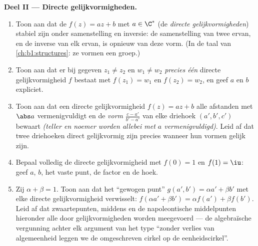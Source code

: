\begin{problem}
\medskip
\noindent\textbf{Deel II --- Directe gelijkvormigheden.}
\begin{enumerate}[resume]
  \item Toon aan dat de  $f(z) = az + b$ met $a \in \C^*$
        (de \emph{directe gelijkvormigheden}) stabiel zijn onder
        samenstelling en inversie: de samenstelling van twee ervan, en
        de inverse van elk ervan, is opnieuw van deze vorm. (In de taal
        van \cref{ch:b1:structures}: ze vormen een groep.)
  \item Toon aan dat er bij gegeven $z_1 \neq z_2$ en $w_1 \neq w_2$
        \emph{precies één} directe gelijkvormigheid $f$ bestaat met
        $f(z_1) = w_1$ en $f(z_2) = w_2$, en geef $a$ en $b$ expliciet.
  \item Toon aan dat een directe gelijkvormigheid $f(z) = az + b$ alle
        afstanden met $\abs a$ vermenigvuldigt en de \emph{vorm}
        $\frac{c - a'}{b' - a'}$ van elke driehoek $(a', b', c')$
        bewaart \emph{(teller en noemer worden allebei met $a$
        vermenigvuldigd)}. Leid af dat twee driehoeken direct
        gelijkvormig zijn precies wanneer hun vormen gelijk zijn.
  \item Bepaal volledig de directe gelijkvormigheid met $f(0) = 1$ en
        $f(1) = \iu$: geef $a$, $b$, het vaste punt, de factor en de
        hoek.
  \item Zij $\alpha + \beta = 1$. Toon aan dat het ``gewogen punt''
        $g(a', b') = \alpha a' + \beta b'$ met elke directe
        gelijkvormigheid verwisselt: $f(\alpha a' + \beta b') = \alpha
        f(a') + \beta f(b')$. Leid af dat zwaartepunten, middens en de
        napoleontische middelpunten hieronder alle door
        gelijkvormigheden worden meegevoerd --- de algebraïsche
        vergunning achter elk argument van het type ``zonder verlies van
        algemeenheid leggen we de omgeschreven cirkel op de
        eenheidscirkel''.
\end{enumerate}


\end{problem}
